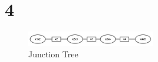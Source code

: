 \section*{4}
\begin{figure}[ht]
    \centering
    \includegraphics[width=0.5\textwidth]{figures/ml4.jpg}
    \caption{Junction Tree}
\end{figure}
